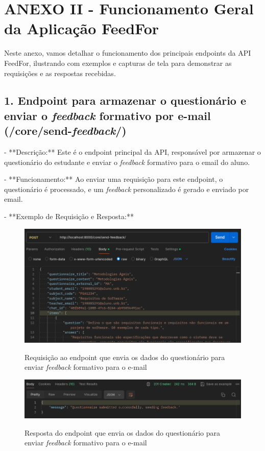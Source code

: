\chapter*{ANEXO II - Funcionamento Geral da Aplicação FeedFor}
\label{anexoIIFGAF}

Neste anexo, vamos detalhar o funcionamento dos principais endpoints da API FeedFor, ilustrando com exemplos e capturas de tela para demonstrar as requisições e as respostas recebidas.

\section*{1. Endpoint para armazenar o questionário e enviar o \textit{feedback} formativo por e-mail (/core/send-\textit{feedback}/)}

- **Descrição:** Este é o endpoint principal da API, responsável por armazenar o questionário do estudante e enviar o \textit{feedback} formativo para o email do aluno.

- **Funcionamento:** Ao enviar uma requisição para este endpoint, o questionário é processado, e um \textit{feedback} personalizado é gerado e enviado por email.

- **Exemplo de Requisição e Resposta:**

\begin{figure}[H]
    \centering
    \caption{Requisição ao endpoint que envia os dados do questionário para enviar \textit{feedback} formativo para o e-mail}
    \includegraphics[width=1\textwidth]{figuras/send_report.png}
    \label{fig:report_questions}
\end{figure}

\begin{figure}[H]
    \centering
    \caption{Resposta do endpoint que envia os dados do questionário para enviar \textit{feedback} formativo para o e-mail}
    \includegraphics[width=1\textwidth]{figuras/send_report_result.png}
    \label{fig:report_questions}
\end{figure}

